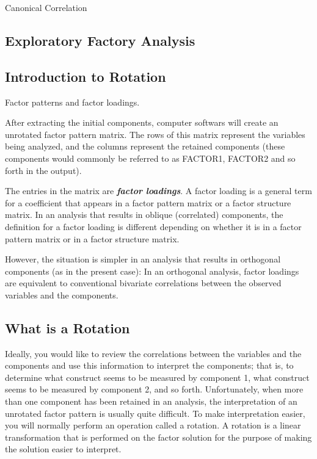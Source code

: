 Canonical Correlation


\subsection{Exploratory Factory Analysis}



\subsection{Introduction to Rotation}


Factor patterns and factor loadings. 

After extracting the initial components, computer softwars
will create an unrotated factor pattern matrix. The rows of this matrix represent the variables
being analyzed, and the columns represent the retained components (these components would commonly be 
referred to as FACTOR1, FACTOR2 and so forth in the output).

The entries in the matrix are \textbf{\emph{factor loadings}}. A factor loading is a general term for a coefficient
that appears in a factor pattern matrix or a factor structure matrix. In an analysis that results in
oblique (correlated) components, the definition for a factor loading is different depending on
whether it is in a factor pattern matrix or in a factor structure matrix. 

However, the situation is simpler in an analysis that results in orthogonal components (as in the present case): In an
orthogonal analysis, factor loadings are equivalent to conventional bivariate correlations between the observed
variables and the components.

\subsection{What is a Rotation}

Ideally, you would like to review the correlations between the variables and the
components and use this information to interpret the components; that is, to determine what
construct seems to be measured by component 1, what construct seems to be measured by
component 2, and so forth. Unfortunately, when more than one component has been retained in
an analysis, the interpretation of an unrotated factor pattern is usually quite difficult. To make
interpretation easier, you will normally perform an operation called a rotation. A rotation is a
linear transformation that is performed on the factor solution for the purpose of making the
solution easier to interpret.

